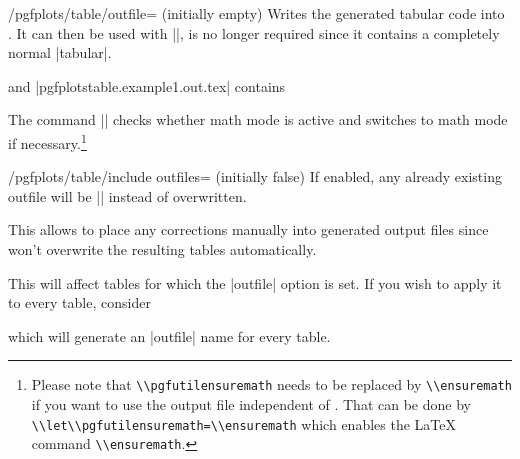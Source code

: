 \documentclass[a4paper]{ltxdoc}
\begin{document}
\begin{key}{/pgfplots/table/outfile= (initially empty)}
\label{page:outfile}
    Writes the generated tabular code into . It can then be
    used with ||, \PGFPlotstable{} is no longer required
    since it contains a completely normal |tabular|.
\begin{codeexample}[]
\end{codeexample}
    and |pgfplotstable.example1.out.tex| contains
    

    The command |\pgfutilensuremath| checks whether math mode is active and
    switches to math mode if necessary.\footnote{Please note that
    \lstinline{\\pgfutilensuremath} needs to be replaced by
    \lstinline{\\ensuremath} if you want to use the output file independent of
    \PGF{}. That can be done by \lstinline{\\let\\pgfutilensuremath=\\ensuremath}
    which enables the \LaTeX{} command \lstinline{\\ensuremath}.}
\end{key}

\begin{key}{/pgfplots/table/include outfiles= (initially false)}
    If enabled, any already existing outfile will be || instead of
    overwritten.
\begin{codeexample}
\end{codeexample}
    This allows to place any corrections manually into generated output files
    since \PGFPlotstable{} won't overwrite the resulting tables automatically.

    This will affect tables for which the |outfile| option is set. If you wish
    to apply it to every table, consider
\begin{codeexample}
\end{codeexample}
    \noindent which will generate an |outfile| name for every table.
\end{key}
\end{document}
